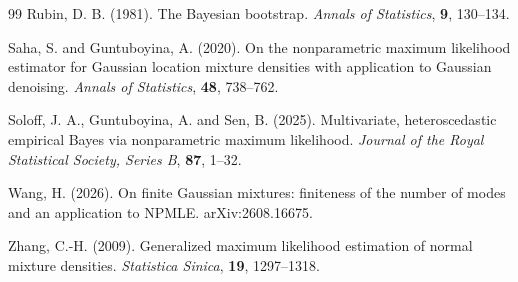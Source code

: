 \documentclass[11pt]{article}
\theoremstyle{definition}
\theoremstyle{remark}
\begin{document}
\begin{thebibliography}{99}
Rubin, D. B. (1981).
\newblock The Bayesian bootstrap.
\newblock \emph{Annals of Statistics}, \textbf{9}, 130--134.

Saha, S. and Guntuboyina, A. (2020).
\newblock On the nonparametric maximum likelihood estimator for Gaussian
location mixture densities with application to Gaussian denoising.
\newblock \emph{Annals of Statistics}, \textbf{48}, 738--762.

Soloff, J. A., Guntuboyina, A. and Sen, B. (2025).
\newblock Multivariate, heteroscedastic empirical Bayes via nonparametric
maximum likelihood.
\newblock \emph{Journal of the Royal Statistical Society, Series B},
\textbf{87}, 1--32.

Wang, H. (2026).
\newblock On finite Gaussian mixtures: finiteness of the number of modes and
an application to NPMLE.
\newblock arXiv:2608.16675.

Zhang, C.-H. (2009).
\newblock Generalized maximum likelihood estimation of normal mixture
densities.
\newblock \emph{Statistica Sinica}, \textbf{19}, 1297--1318.

\end{thebibliography}
\end{document}
